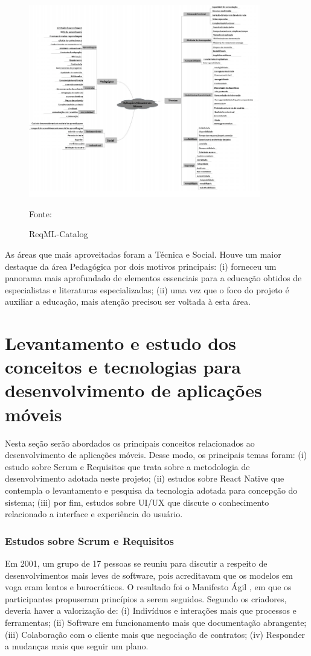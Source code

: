 \begin{figure}[H]
\centering
    \caption{ReqML-Catalog}
    \label{fig:reqML}
    \includegraphics[width=0.9\textwidth]{Figuras/reqML-catalog.png}
    
    Fonte: \cite{soad2017reqml}
\end{figure}

As áreas que mais aproveitadas foram a Técnica e Social. Houve um maior destaque da área Pedagógica por dois motivos principais: (i) forneceu um panorama mais aprofundado de elementos essenciais para a educação obtidos de especialistas e literaturas especializadas; (ii) uma vez que o foco do projeto é auxiliar a educação, mais atenção precisou ser voltada à esta área.

\section{Levantamento e estudo dos conceitos e tecnologias para desenvolvimento de aplicações móveis}

Nesta seção serão abordados os principais conceitos relacionados ao desenvolvimento de aplicações móveis. Desse modo, os principais temas foram: (i) estudo sobre Scrum e Requisitos que trata sobre a metodologia de desenvolvimento adotada neste projeto; (ii) estudos sobre React Native que contempla o levantamento e pesquisa da tecnologia adotada para concepção do sistema; (iii) por fim, estudos sobre UI/UX que discute o conhecimento relacionado a interface e experiência do usuário.

\subsubsection{Estudos sobre Scrum e Requisitos} 
Em 2001, um grupo de 17 pessoas se reuniu para discutir a respeito de desenvolvimentos mais leves de software, pois acreditavam que os modelos em voga eram lentos e burocráticos. O resultado foi o Manifesto Ágil \citep{agileManifesto}, em que os participantes propuseram princípios a serem seguidos. Segundo os criadores, deveria haver a valorização de: (i) Indivíduos e interações mais que processos e ferramentas; (ii) Software em funcionamento mais que documentação abrangente; (iii) Colaboração com o cliente mais que negociação de contratos; (iv) Responder a mudanças mais que seguir um plano.

